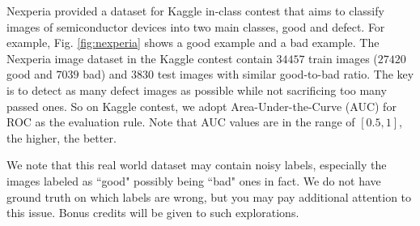 \documentclass[11pt]{article}
\begin{document}
Nexperia provided a dataset for Kaggle in-class contest that aims to classify images of semiconductor devices into two main classes, good and defect. For example, Fig. \ref{fig:nexperia} shows a good example and a bad example. The Nexperia image dataset in the Kaggle contest contain $34457$ train images ($27420$ good and $7039$ bad) and $3830$ test images with similar good-to-bad ratio. The key is to detect as many defect images as possible while not sacrificing too many passed ones. So on Kaggle contest, we adopt Area-Under-the-Curve (AUC) for ROC as the evaluation rule. Note that AUC values are in the range of $[0.5,1]$, the higher, the better.

We note that this real world dataset may contain noisy labels, especially the images labeled as ``good" possibly being ``bad" ones in fact. We do not have ground truth on which labels are wrong, but you may pay additional attention to this issue. Bonus credits will be given to such explorations. 


\end{document}
